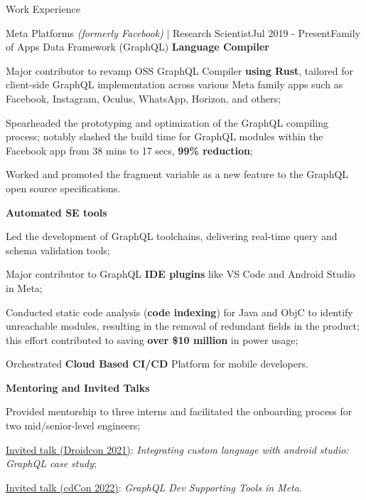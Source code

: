 \documentclass{resume} %
\begin{document}

\begin{rSection}{Work Experience}
\begin{rSubsection}{Meta Platforms \textit{(formerly Facebook)} $|$ Research Scientist}{Jul 2019 - Present}{Family of Apps Data Framework (GraphQL)}{}
\textbf{Language Compiler}
\item Major contributor to revamp OSS GraphQL Compiler \textbf{using Rust}, tailored for client-side GraphQL implementation across various Meta family apps such as Facebook, Instagram, Oculus, WhatsApp, Horizon, and others;
\item Spearheaded the prototyping and optimization of the GraphQL compiling process; notably slashed the build time for GraphQL modules within the Facebook app from 38 mins to 17 secs, \textbf{99\% reduction};
\item Worked and promoted the fragment variable as a new feature to the GraphQL open source specifications.

\textbf{Automated SE tools}
\item Led the development of GraphQL toolchains, delivering real-time query and schema validation tools;
\item Major contributor to GraphQL \textbf{IDE plugins} like VS Code and Android Studio in Meta;
\item Conducted static code analysis (\textbf{code indexing}) for Java and ObjC to identify unreachable modules, resulting in the removal of redundant fields in the product; this effort contributed to saving \textbf{over \$10 million} in power usage;
\item Orchestrated \textbf{Cloud Based CI/CD} Platform for mobile developers.

\textbf{Mentoring and Invited Talks}
\item Provided mentorship to three interns and facilitated the onboarding process for two mid/senior-level engineers;
\item \href{https://www.droidcon.com/2021/11/23/integrating-custom-language-with-android-studio-graphql-case-study/}{Invited talk (Droidcon 2021)}: \textit{Integrating custom language with android studio: GraphQL case study};
\item \href{https://cdcon2022.sched.com/}{Invited talk (cdCon 2022)}: \textit{GraphQL Dev Supporting Tools in Meta}.




\end{rSubsection}
\end{rSection}
\end{document}
